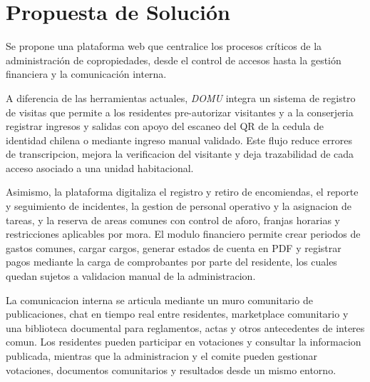 

\section{Propuesta de Solución}

Se propone una plataforma web que centralice los procesos críticos de la administración de copropiedades, desde el control de accesos hasta la gestión financiera y la comunicación interna.

A diferencia de las herramientas actuales, \textit{DOMU} integra un sistema de registro de visitas que permite a los residentes pre-autorizar visitantes y a la conserjeria registrar ingresos y salidas con apoyo del escaneo del QR de la cedula de identidad chilena o mediante ingreso manual validado. Este flujo reduce errores de transcripcion, mejora la verificacion del visitante y deja trazabilidad de cada acceso asociado a una unidad habitacional.

Asimismo, la plataforma digitaliza el registro y retiro de encomiendas, el reporte y seguimiento de incidentes, la gestion de personal operativo y la asignacion de tareas, y la reserva de areas comunes con control de aforo, franjas horarias y restricciones aplicables por mora. El modulo financiero permite crear periodos de gastos comunes, cargar cargos, generar estados de cuenta en PDF y registrar pagos mediante la carga de comprobantes por parte del residente, los cuales quedan sujetos a validacion manual de la administracion.

La comunicacion interna se articula mediante un muro comunitario de publicaciones, chat en tiempo real entre residentes, marketplace comunitario y una biblioteca documental para reglamentos, actas y otros antecedentes de interes comun. Los residentes pueden participar en votaciones y consultar la informacion publicada, mientras que la administracion y el comite pueden gestionar votaciones, documentos comunitarios y resultados desde un mismo entorno.

